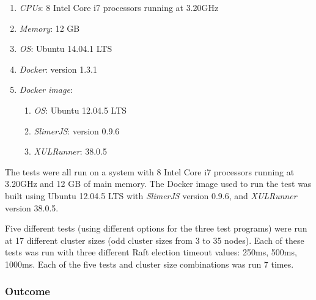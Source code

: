 \documentclass[conference,compsoc]{./IEEEtran/IEEEtran}
\begin{document}
\begin{enumerate}
    \item \emph{CPUs}: 8 Intel Core i7 processors running at 3.20GHz
    \item \emph{Memory}: 12 GB
    \item \emph{OS}: Ubuntu 14.04.1 LTS
    \item \emph{Docker}: version 1.3.1
    \item \emph{Docker image}:
    \begin{enumerate}
        \item \emph{OS}: Ubuntu 12.04.5 LTS
        \item \emph{SlimerJS}: version 0.9.6
        \item \emph{XULRunner}: 38.0.5
    \end{enumerate}
\end{enumerate}
\else
The tests were all run on a system with 8 Intel Core i7 processors
running at 3.20GHz and 12 GB of main memory. The Docker image used to
run the test was built using Ubuntu 12.04.5 LTS with \emph{SlimerJS}
version 0.9.6, and \emph{XULRunner} version 38.0.5.
\fi


Five different tests (using different options for the three test
programs) were run at 17 different cluster sizes (odd cluster sizes
from 3 to 35 nodes). Each of these tests was run with three different
Raft election timeout values: 250ms, 500ms, 1000ms. Each of the five
tests and cluster size combinations was run 7 times.

\subsubsection{Outcome}
\end{document}
